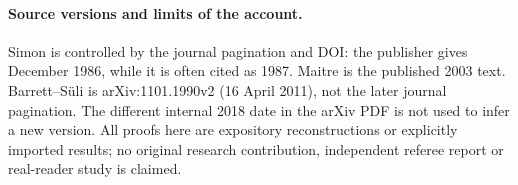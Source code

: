 \documentclass[12pt,reqno]{amsart}
\begin{document}
\paragraph{Source versions and limits of the account.}
Simon is controlled by the journal pagination and DOI: the publisher gives December 1986, while it is often cited as 1987. Maitre is the published 2003 text. Barrett--S\"uli is arXiv:1101.1990v2 (16 April 2011), not the later journal pagination. The different internal 2018 date in the arXiv PDF is not used to infer a new version. All proofs here are expository reconstructions or explicitly imported results; no original research contribution, independent referee report or real-reader study is claimed.


\end{document}
